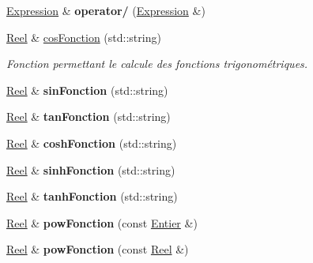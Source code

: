 \begin{DoxyCompactItemize}
\item 
\hypertarget{class_reel_a31869a7f7ededbb5a7f7f28003772a27}{\hyperlink{class_expression}{Expression} \& {\bfseries operator/} (\hyperlink{class_expression}{Expression} \&)}\label{class_reel_a31869a7f7ededbb5a7f7f28003772a27}

\item 
\hyperlink{class_reel}{Reel} \& \hyperlink{class_reel_a616d1bee36a89b7b260dfcf20def9b31}{cos\-Fonction} (std\-::string)
\begin{DoxyCompactList}\small\item\em Fonction permettant le calcule des fonctions trigonométriques. \end{DoxyCompactList}\item 
\hypertarget{class_reel_a161e78d47946bf8c378fe3557e48216e}{\hyperlink{class_reel}{Reel} \& {\bfseries sin\-Fonction} (std\-::string)}\label{class_reel_a161e78d47946bf8c378fe3557e48216e}

\item 
\hypertarget{class_reel_aa3255623962ac83582e8f03ec13a46a5}{\hyperlink{class_reel}{Reel} \& {\bfseries tan\-Fonction} (std\-::string)}\label{class_reel_aa3255623962ac83582e8f03ec13a46a5}

\item 
\hypertarget{class_reel_abe5066f774acbc7da0079140fbd9241d}{\hyperlink{class_reel}{Reel} \& {\bfseries cosh\-Fonction} (std\-::string)}\label{class_reel_abe5066f774acbc7da0079140fbd9241d}

\item 
\hypertarget{class_reel_a477be70385a7b3c9fbd7262da79caed0}{\hyperlink{class_reel}{Reel} \& {\bfseries sinh\-Fonction} (std\-::string)}\label{class_reel_a477be70385a7b3c9fbd7262da79caed0}

\item 
\hypertarget{class_reel_a05e059ba72c006f0591018be209e9288}{\hyperlink{class_reel}{Reel} \& {\bfseries tanh\-Fonction} (std\-::string)}\label{class_reel_a05e059ba72c006f0591018be209e9288}

\item 
\hypertarget{class_reel_a46c360be20bcb968e8b885322caf84b9}{\hyperlink{class_reel}{Reel} \& {\bfseries pow\-Fonction} (const \hyperlink{class_entier}{Entier} \&)}\label{class_reel_a46c360be20bcb968e8b885322caf84b9}

\item 
\hypertarget{class_reel_adf1996a2b7dd40325244f9b431eaf814}{\hyperlink{class_reel}{Reel} \& {\bfseries pow\-Fonction} (const \hyperlink{class_reel}{Reel} \&)}\label{class_reel_adf1996a2b7dd40325244f9b431eaf814}


\end{DoxyCompactItemize}
